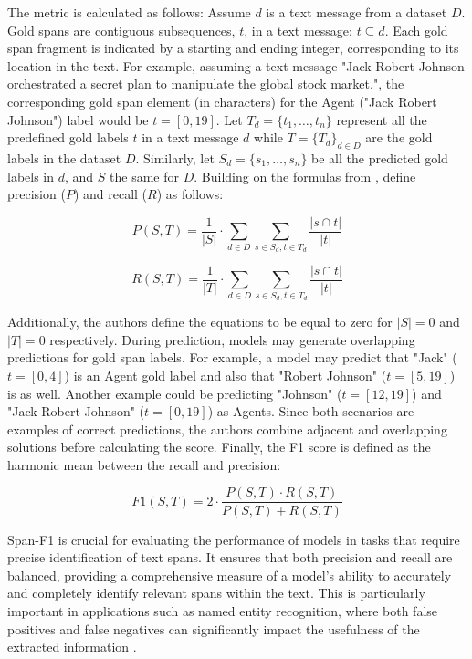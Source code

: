\documentclass{Configuration_Files/PoliMi3i_thesis}
\begin{document}
The metric is calculated as follows:
Assume \(d\) is a text message from a dataset \(D\). Gold spans are contiguous subsequences, \(t\), in a text message: \(t \subseteq d\). Each gold span fragment is indicated by a starting and ending integer, corresponding to its location in the text. For example, assuming a text message "Jack Robert Johnson orchestrated a secret plan to manipulate the global stock market.", the corresponding gold span element (in characters) for the Agent ("Jack Robert Johnson") label would be \(t = [0, 19]\). Let \(T_d = \{t_1, \ldots, t_n\}\) represent all the predefined gold labels \(t\) in a text message \(d\) while \(T = \{T_d\}_{d \in D}\) are the gold labels in the dataset \(D\). Similarly, let \(S_d = \{s_1, \ldots, s_n\}\) be all the predicted gold labels in \(d\), and \(S\) the same for \(D\). Building on the formulas from \cite{potthast-etal-2010-evaluation},  \cite{da2020semeval} define precision (\(P\)) and recall (\(R\)) as follows:

\[
P(S, T) = \frac{1}{|S|} \cdot \sum_{d \in D} \sum_{s \in S_d, t \in T_d} \frac{|s \cap t|}{|t|}
\]

\[
R(S, T) = \frac{1}{|T|} \cdot \sum_{d \in D} \sum_{s \in S_d, t \in T_d} \frac{|s \cap t|}{|t|}
\]

Additionally, the authors define the equations to be equal to zero for \(|S| = 0\) and \(|T| = 0\) respectively. During prediction, models may generate overlapping predictions for gold span labels. For example, a model may predict that "Jack" (\(t = [0, 4]\)) is an Agent gold label and also that "Robert Johnson" (\(t = [5, 19]\)) is as well. Another example could be predicting "Johnson" (\(t = [12, 19]\)) and "Jack Robert Johnson" (\(t = [0, 19]\)) as Agents. Since both scenarios are examples of correct predictions, the authors combine adjacent and overlapping solutions before calculating the score. Finally, the F1 score is defined as the harmonic mean between the recall and precision:

\[
F1(S, T) = 2 \cdot \frac{P(S, T) \cdot R(S, T)}{P(S, T) + R(S, T)}
\]

Span-F1 is crucial for evaluating the performance of models in tasks that require precise identification of text spans. It ensures that both precision and recall are balanced, providing a comprehensive measure of a model's ability to accurately and completely identify relevant spans within the text. This is particularly important in applications such as named entity recognition, where both false positives and false negatives can significantly impact the usefulness of the extracted information \cite{yadav2018survey}.
\end{document}
